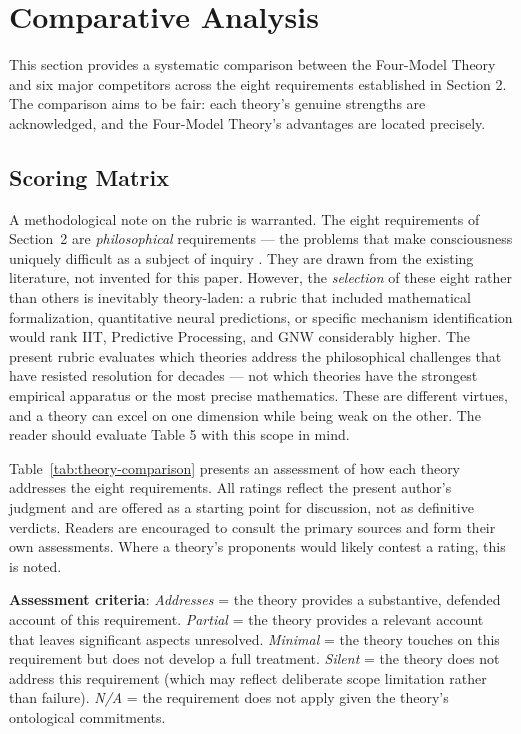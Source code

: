 \documentclass[12pt]{article}
\begin{document}
\section{Comparative Analysis}


This section provides a systematic comparison between the Four-Model Theory and six major competitors across the eight requirements established in Section 2. The comparison aims to be fair: each theory's genuine strengths are acknowledged, and the Four-Model Theory's advantages are located precisely.


\subsection{Scoring Matrix}


A methodological note on the rubric is warranted. The eight requirements of Section~2 are \emph{philosophical} requirements --- the problems that make consciousness uniquely difficult as a subject of inquiry \citep{Chalmers1995,Levine1983,Nagel1974,Jackson1982,Bayne2010,Chalmers2018}. They are drawn from the existing literature, not invented for this paper. However, the \emph{selection} of these eight rather than others is inevitably theory-laden: a rubric that included mathematical formalization, quantitative neural predictions, or specific mechanism identification would rank IIT, Predictive Processing, and GNW considerably higher. The present rubric evaluates which theories address the philosophical challenges that have resisted resolution for decades --- not which theories have the strongest empirical apparatus or the most precise mathematics. These are different virtues, and a theory can excel on one dimension while being weak on the other. The reader should evaluate Table 5 with this scope in mind.

Table~\ref{tab:theory-comparison} presents an assessment of how each theory addresses the eight requirements. All ratings reflect the present author's judgment and are offered as a starting point for discussion, not as definitive verdicts. Readers are encouraged to consult the primary sources and form their own assessments. Where a theory's proponents would likely contest a rating, this is noted.

\textbf{Assessment criteria}: \emph{Addresses} = the theory provides a substantive, defended account of this requirement. \emph{Partial} = the theory provides a relevant account that leaves significant aspects unresolved. \emph{Minimal} = the theory touches on this requirement but does not develop a full treatment. \emph{Silent} = the theory does not address this requirement (which may reflect deliberate scope limitation rather than failure). \emph{N/A} = the requirement does not apply given the theory's ontological commitments.
\end{document}
